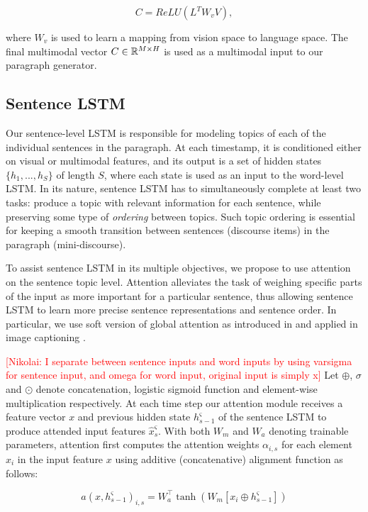 \documentclass[11pt,a4paper]{article}
\newcommand{\kibitz}[2]{\ifnum\Comments=1\textcolor{#1}{#2}\fi}
\newcommand{\nikolai}[1]{\kibitz{red}      {[Nikolai: #1]}}
\newcommand{\R}{\mathbb{R}}
\begin{document}
\begin{equation}
    C = ReLU(L^TW_vV),
\end{equation}

where $W_v$ is used to learn a mapping from vision space to language space. The final multimodal vector $C \in \R\sp{M \times H}$ is used as a multimodal input to our paragraph generator.

\subsection{Sentence LSTM}
Our sentence-level LSTM is responsible for modeling topics of each of the individual sentences in the paragraph.
At each timestamp, it is conditioned either on visual or multimodal features, and its output is a set of hidden states $\{h_1, ..., h_S\}$ of length $S$, where each state is used as an input to the word-level LSTM.
In its nature, sentence LSTM has to simultaneously complete at least two tasks: produce a topic with relevant information for each sentence, while preserving some type of \textit{ordering} between topics.
Such topic ordering is essential for keeping a smooth transition between sentences (discourse items) in the paragraph (mini-discourse).

To assist sentence LSTM in its multiple objectives, we propose to use attention on the sentence topic level.
Attention alleviates the task of weighing specific parts of the input as more important for a particular sentence, thus allowing sentence LSTM to learn more precise sentence representations and sentence order.
In particular, we use soft version of global attention as introduced in \cite{bahdanau2014neural} and applied in image captioning \cite{xu2015attend,luong2015effective}.

\nikolai{I separate between sentence inputs and word inputs by using varsigma for sentence input, and omega for word input, original input is simply x}
Let $\oplus$, $\sigma$ and $\odot$ denote concatenation, logistic sigmoid function and element-wise multiplication respectively.
At each time step our attention module receives a feature vector $x$ and previous hidden state $h^\varsigma_{s-1}$ of the sentence LSTM to produce attended input features $\hat{x}^\varsigma_s$.
With both $W_m$ and $W_a$ denoting trainable parameters, attention first computes the attention weights $\alpha_{i,s}$ for each element $x_i$ in the input feature $x$ using additive (concatenative) alignment function as follows:

\begin{equation}
    a(x, h^\varsigma_{s-1})_{i,s} = W_a^\top \tanh (W_m[x_i \oplus h^\varsigma_{s-1}])
\end{equation}
\end{document}

